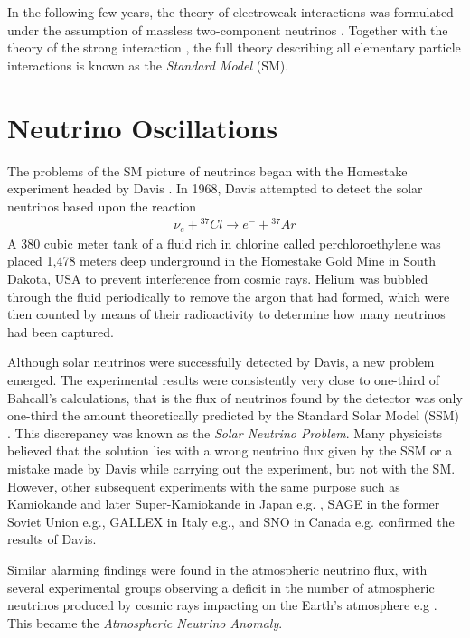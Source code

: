 \documentclass[english]{article}
\begin{document}
    In the following few years, the theory of electroweak interactions was formulated under the assumption of massless two-component neutrinos \cite{glashow1961} \cite{goldstonesalamweinberg1962} \cite{weinberg1967}. Together with the theory of the strong interaction \cite{grosswilczek1973} \cite{politzer1973}, the full theory describing all elementary particle interactions is known as the \textit{Standard Model} (SM).

\section{Neutrino Oscillations}
	The problems of the SM picture of neutrinos began with the Homestake experiment headed by Davis \cite{davis1968}. In 1968, Davis attempted to detect the solar neutrinos based upon the reaction
    \begin{gather}
    	\nu_{e} + {}^{37} Cl \rightarrow e^{-} + {}^{37} Ar
    \end{gather}
    A 380 cubic meter tank of a fluid rich in chlorine called perchloroethylene was placed 1,478 meters deep underground in the Homestake Gold Mine in South Dakota, USA to prevent interference from cosmic rays. Helium was bubbled through the fluid periodically to remove the argon that had formed, which were then counted by means of their radioactivity to determine how many neutrinos had been captured.
    
    Although solar neutrinos were successfully detected by Davis, a new problem emerged. The experimental results were consistently very close to one-third of Bahcall's calculations, that is the flux of neutrinos found by the detector was only one-third the amount theoretically predicted by the Standard Solar Model (SSM) \cite{davis1998} \cite{bahcall2004}. This discrepancy was known as the \textit{Solar Neutrino Problem}. Many physicists believed that the solution lies with a wrong neutrino flux given by the SSM or a mistake made by Davis while carrying out the experiment, but not with the SM. However, other subsequent experiments with the same purpose such as Kamiokande and later Super-Kamiokande in Japan e.g.\cite{kamiokande1991} \cite{superk2016}, SAGE in the former Soviet Union e.g.\cite{sage1991}, GALLEX in Italy e.g.\cite{gallex1999}, and SNO in Canada e.g.\cite{sno2001} confirmed the results of Davis.
    
    Similar alarming findings were found in the atmospheric neutrino flux, with several experimental groups observing a deficit in the number of atmospheric neutrinos produced by cosmic rays impacting on the Earth’s atmosphere e.g\cite{hirata1998} \cite{casper1991} \cite{macro1998}. This became the \textit{Atmospheric Neutrino Anomaly}.
    
\end{document}
